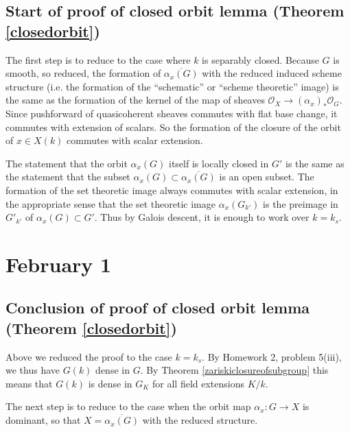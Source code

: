 \documentclass[10pt]{article}
\newcommand{\cO}{\mathcal{O}}
\renewcommand{\(}{\left(}
\renewcommand{\)}{\right)}
\renewcommand{\bar}{\overline}
\numberwithin{thm}{subsection}
\begin{document}
\subsection{Start of proof of closed orbit lemma (Theorem \ref{closedorbit})}
The first step is to reduce to the case where $k$ is separably closed.
Because $G$ is smooth, so reduced,
the formation of $\bar{\alpha_x(G)}$ with the reduced induced scheme structure
(i.e. the formation of the ``schematic'' or ``scheme theoretic'' image)
is the same as the formation of the kernel of the map of sheaves
$\cO_X\to (\alpha_x)_*\cO_G$. Since pushforward of quasicoherent sheaves
commutes with flat base change, it commutes with extension of scalars.
So the formation of the closure of the orbit of $x\in X(k)$
commutes with scalar extension.

The statement that the orbit $\alpha_x(G)$ itself is locally closed
in $G'$ is the same as the statement that
the subset  $\alpha_x(G)\subset \bar{\alpha_x(G)}$
is an open subset.
The formation of the set theoretic image always commutes with scalar extension,
in the appropriate sense
that the set theoretic image $\alpha_x(G_{k'})$ is the preimage
in $G'_{k'}$ of $\alpha_x(G)\subset G'$.
Thus by Galois descent, it is enough to work over $k=k_s$.

\section{February 1}
\subsection{Conclusion of proof of closed orbit lemma (Theorem \ref{closedorbit})}
Above we reduced the proof to the case $k=k_s$.
By Homework 2, problem 5(iii), we thus have $G(k)$ dense in $G$.
By Theorem 
\ref{zariskiclosureofsubgroup} this means that $G(k)$ is dense in $G_K$ for all field extensions $K/k$.

The next step is to reduce to the case when the orbit map $\alpha_x:G\to X$
is dominant, so that $X=\bar{\alpha_x(G)}$ with the reduced structure.
\end{document}
